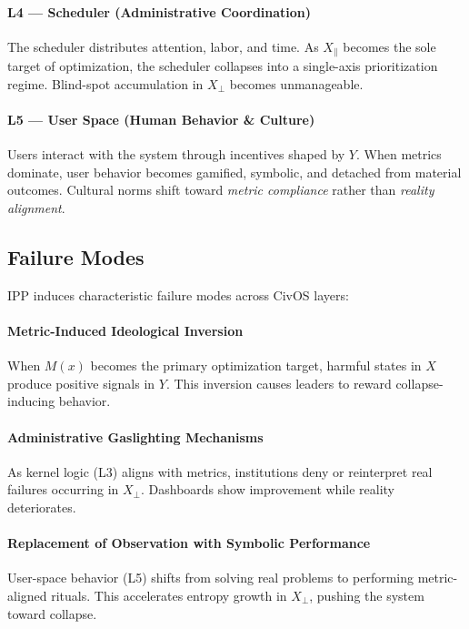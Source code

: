 \documentclass[11pt]{article}
\begin{document}
\paragraph{L4 --- Scheduler (Administrative Coordination)}
The scheduler distributes attention, labor, and time.
As $X_{\parallel}$ becomes the sole target of optimization, the scheduler collapses into a single-axis prioritization regime.
Blind-spot accumulation in $X_{\perp}$ becomes unmanageable.

\paragraph{L5 --- User Space (Human Behavior \& Culture)}
Users interact with the system through incentives shaped by $Y$.
When metrics dominate, user behavior becomes gamified, symbolic, and detached from material outcomes.
Cultural norms shift toward \emph{metric compliance} rather than \emph{reality alignment}.

\subsection{Failure Modes}

IPP induces characteristic failure modes across CivOS layers:

\paragraph{Metric-Induced Ideological Inversion}
When $M(x)$ becomes the primary optimization target, harmful states in $X$ produce positive signals in $Y$.
This inversion causes leaders to reward collapse-inducing behavior.

\paragraph{Administrative Gaslighting Mechanisms}
As kernel logic (L3) aligns with metrics, institutions deny or reinterpret real failures occurring in $X_{\perp}$.
Dashboards show improvement while reality deteriorates.

\paragraph{Replacement of Observation with Symbolic Performance}
User-space behavior (L5) shifts from solving real problems to performing metric-aligned rituals.
This accelerates entropy growth in $X_{\perp}$, pushing the system toward collapse.
\end{document}
